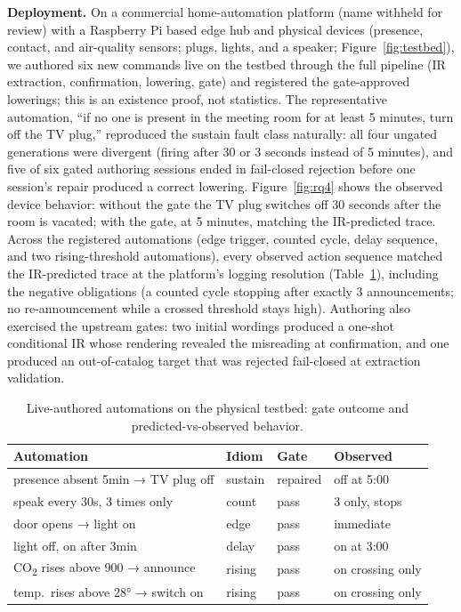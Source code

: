 \documentclass[sigconf,nonacm,anonymous,review]{acmart}
\begin{document}
\textbf{Deployment.} On a commercial home-automation platform (name withheld for review) with a Raspberry Pi based edge hub and physical devices (presence, contact, and air-quality sensors; plugs, lights, and a speaker; Figure~\ref{fig:testbed}), we authored six new commands live on the testbed through the full pipeline (IR extraction, confirmation, lowering, gate) and registered the gate-approved lowerings; this is an existence proof, not statistics. The representative automation, ``if no one is present in the meeting room for at least 5 minutes, turn off the TV plug,'' reproduced the sustain fault class naturally: all four ungated generations were divergent (firing after 30 or 3 seconds instead of 5 minutes), and five of six gated authoring sessions ended in fail-closed rejection before one session's repair produced a correct lowering. Figure~\ref{fig:rq4} shows the observed device behavior: without the gate the TV plug switches off 30 seconds after the room is vacated; with the gate, at 5 minutes, matching the IR-predicted trace. Across the registered automations (edge trigger, counted cycle, delay sequence, and two rising-threshold automations), every observed action sequence matched the IR-predicted trace at the platform's logging resolution (Table~\ref{tab:deploy}), including the negative obligations (a counted cycle stopping after exactly 3 announcements; no re-announcement while a crossed threshold stays high). Authoring also exercised the upstream gates: two initial wordings produced a one-shot conditional IR whose rendering revealed the misreading at confirmation, and one produced an out-of-catalog target that was rejected fail-closed at extraction validation.

\begin{table}[t]
\centering
\caption{Live-authored automations on the physical testbed: gate outcome and predicted-vs-observed behavior.}
\label{tab:deploy}
\small
\setlength{\tabcolsep}{4pt}
\begin{tabular}{llll}
\toprule
Automation & Idiom & Gate & Observed \\
\midrule
presence absent 5min → TV plug off & sustain & repaired & off at 5:00 \\
speak every 30s, 3 times only & count & pass & 3 only, stops \\
door opens → light on & edge & pass & immediate \\
light off, on after 3min & delay & pass & on at 3:00 \\
CO\textsubscript{2} rises above 900 → announce & rising & pass & on crossing only \\
temp.\ rises above 28° → switch on & rising & pass & on crossing only \\
\bottomrule
\end{tabular}
\end{table}
\end{document}
